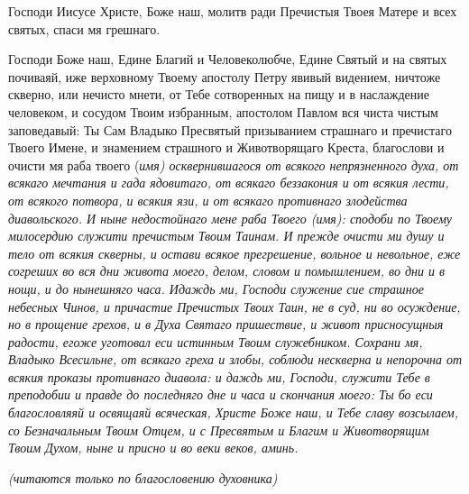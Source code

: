 Господи Иисусе Христе, Боже наш, молитв ради Пречистыя Твоея Матере и всех святых, спаси мя грешнаго.



Господи Боже наш, Едине Благий и Человеколюбче, Едине Святый и на святых почиваяй, иже верховному Твоему апостолу Петру явивый видением, ничтоже скверно, или нечисто мнети, от Тебе сотворенных на пищу и в наслаждение человеком, и сосудом Твоим избранным, апостолом Павлом вся чиста чистым заповедавый: Ты Сам Владыко Пресвятый призыванием страшнаго и пречистаго Твоего Имене, и знамением страшного и Животворящаго Креста, благослови и очисти мя раба твоего (\itshape имя\normalfont{}) осквернившагося от всякого непрязненного духа, от всякаго мечтания и гада ядовитаго, от всякаго беззакония и от всякия лести, от всякого потвора, и всякия язи, и от всякаго противнаго злодейства диавольского. И ныне недостойнаго мене раба Твоего (\itshape имя\normalfont{}): сподоби по Твоему милосердию служити пречистым Твоим Таинам. И прежде очисти ми душу и тело от всякия скверны, и остави всякое прегрешение, вольное и невольное, еже согреших во вся дни живота моего, делом, словом и помышлением, во дни и в нощи, и до нынешняго часа. Идаждь ми, Господи служение сие страшное небесных Чинов, и причастие Пречистых Твоих Таин, не в суд, ни во осуждение, но в прощение грехов, и в Духа Святаго пришествие, и живот присносущныя радости, егоже уготовал еси истинным Твоим служебником. Сохрани мя, Владыко Всесильне, от всякаго греха и злобы, соблюди нескверна и непорочна от всякия проказы противнаго диавола: и даждь ми, Господи, служити Тебе в преподобии и правде до последняго дне и часа и скончания моего: Ты бо еси благословляяй и освящаяй всяческая, Христе Боже наш, и Тебе славу возсылаем, со Безначальным Твоим Отцем, и с Пресвятым и Благим и Животворящим Твоим Духом, ныне и присно и во веки веков, аминь.
\mychapterending

 


\itshape (читаются только по благословению духовника)

\normalfont{}

